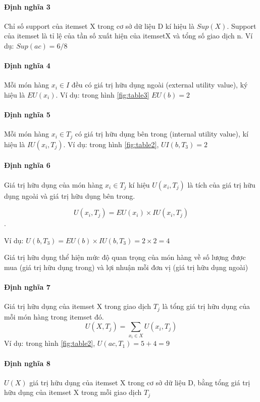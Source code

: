 \paragraph{Định nghĩa 3} Chỉ số support của itemset X trong cơ sở dữ liệu D kí hiệu là $Sup(X)$. Support của itemset là tỉ lệ của tần số xuất hiện của itemsetX và tổng số giao dịch n. Ví dụ: $Sup(ac) = 6/8$

\paragraph{Định nghĩa 4} Mỗi món hàng $x_i \in I$ đều có giá trị hữu dụng ngoài (external utility value), ký hiệu là $EU(x_i)$. Ví dụ: trong hình \ref{fig:table3} $EU(b) = 2$

\paragraph{Định nghĩa 5} Mỗi món hàng $x_i \in T_j$ có giá trị hữu dụng bên trong (internal utility value), kí hiệu là $IU(x_i, T_j)$. Ví dụ: trong hình \ref{fig:table2}, $UI(b, T_3) = 2$

\paragraph{Định nghĩa 6} Giá trị hữu dụng của món hàng $x_i \in T_j$ kí hiệu $U(x_i, T_j)$ là tích của giá trị hữu dụng ngoài và giá trị hữu dụng bên trong. 

$$ U(x_i, T_j) = EU(x_i) \times IU(x_i, T_j) $$ .

Ví dụ: $U(b, T_3) = EU(b) \times IU(b, T_3) = 2 \times 2 = 4$

Giá trị hữu dụng thể hiện mức độ quan trọng của món hàng về số lượng được mua (giá trị hữu dụng trong) và lợi nhuận mỗi đơn vị (giá trị hữu dụng ngoài)

\paragraph{Định nghĩa 7} Giá trị hữu dụng của itemset X trong giao dịch $T_j$ là tổng giá trị hữu dụng của mỗi món hàng trong itemset đó. 
$$U(X, T_j) = \sum_{x_i \in X} U(x_i, T_j)$$
Ví dụ: trong hình \ref{fig:table2}, $U(ac, T_1) = 5 + 4 = 9$

\paragraph{Định nghĩa 8} $U(X)$ giá trị hữu dụng của itemset X trong cơ sở dữ liệu D, bằng tổng giá trị hữu dụng của itemset X trong mỗi giao dịch $T_j$

